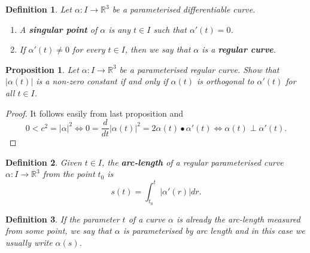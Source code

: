 \documentclass{amsart}
\newtheorem{prop}{Proposition}
\newtheorem{mydef}{Definition}
\begin{document}
\begin{mydef}
Let \(\alpha:I \to \mathbb{R}^3\) be a parameterised differentiable curve. 
\begin{enumerate}
\item A \textbf{singular point} of \(\alpha\) is any \(t\in I\) such that \(\alpha'(t) = 0\).
\item If \(\alpha'(t) \neq 0\) for every \(t\in I\), then we say that \(\alpha\) is a \textbf{regular curve}.
\end{enumerate}
\end{mydef}

\begin{prop}
Let \(\alpha : I\to \mathbb{R}^3\) be a parameterised regular curve. Show that \(|\alpha(t)|\) is a non-zero constant if and only if \(\alpha(t)\) is orthogonal to \(\alpha'(t)\) for all \(t\in I\).
\end{prop}
\begin{proof}
It follows easily from last proposition and
\[ 0 < c^2 = |\alpha|^2 \Leftrightarrow 0 = \frac{d}{dt} |\alpha(t)|^2 = 2 \alpha(t)\bullet \alpha'(t) \Leftrightarrow \alpha(t) \perp \alpha'(t).\]
\end{proof}


\begin{mydef}
Given \(t \in I\), the \textbf{arc-length} of a regular parameterised curve \(\alpha: I \to \mathbb{R}^3\) from the point \(t_0\) is \[ s(t) = \int_{t_0}^{t} |\alpha'(r)| dr. \]
\end{mydef}

\begin{mydef}
If the parameter \(t\) of a curve \(\alpha\) is already the arc-length measured from some point,
we say that \(\alpha\) is parameterised by arc length and in this case we usually write \(\alpha(s)\).
\end{mydef}
\end{document}
